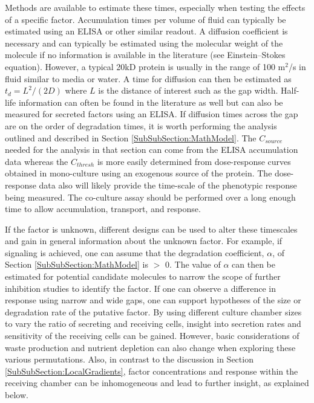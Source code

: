 Methods are available to estimate these times, especially when testing the effects of a specific factor. Accumulation times per volume of fluid can typically be estimated using an ELISA or other similar readout. A diffusion coefficient is necessary and can typically be estimated using the molecular weight of the molecule if no information is available in the literature (see Einstein–Stokes equation). However, a typical 20kD protein is usually in the range of 100 \textmu m$^{2}$/s in fluid similar to media or water. A time for diffusion can then be estimated as $t_{d} = L^{2}/(2D)$ where $L$ is the distance of interest such as the gap width. Half-life information can often be found in the literature as well but can also be measured for secreted factors using an ELISA. If diffusion times across the gap are on the order of degradation times, it is worth performing the analysis outlined and described in Section \ref{SubSubSection:MathModel}. The $C_{source}$ needed for the analysis in that section can come from the ELISA accumulation data whereas the $C_{thresh}$ is more easily determined from dose-response curves obtained in mono-culture using an exogenous source of the protein. The dose-response data also will likely provide the time-scale of the phenotypic response being measured. The co-culture assay should be performed over a long enough time to allow accumulation, transport, and response.

If the factor is unknown, different designs can be used to alter these timescales and gain in general information about the unknown factor. For example, if signaling is achieved, one can assume that the degradation coefficient, $\alpha$, of Section \ref{SubSubSection:MathModel} is $>$ 0. The value of $\alpha$ can then be estimated for potential candidate molecules to narrow the scope of further inhibition studies to identify the factor. If one can observe a difference in response using narrow and wide gaps, one can support hypotheses of the size or degradation rate of the putative factor. By using different culture chamber sizes to vary the ratio of secreting and receiving cells, insight into secretion rates and sensitivity of the receiving cells can be gained. However, basic considerations of waste production and nutrient depletion can also change when exploring these various permutations. Also, in contrast to the discussion in Section \ref{SubSubSection:LocalGradients}, factor concentrations and response within the receiving chamber can be inhomogeneous and lead to further insight, as explained below.

